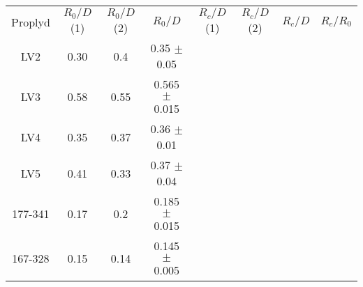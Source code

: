 \begin{table*}
\begin{tabular}{|c|c|c|c|c|c|c|c|}
Proplyd & $R_0/D$ (1) & $R_0/D $ (2) & $R_0/D$ & $R_c/D$ (1) & $R_c/D $ (2)  & $R_c/D$  & $R_c/R_0$ \\
LV2     &   0.30  & 0.4  & 0.35  $\pm$ 0.05    & & & & \\
LV3     &   0.58  & 0.55 & 0.565 $\pm$ 0.015   & & & & \\
LV4     &   0.35  & 0.37 & 0.36  $\pm$ 0.01    & & & & \\
LV5     &   0.41  & 0.33 & 0.37  $\pm$ 0.04    & & & & \\
177-341 &   0.17  & 0.2  & 0.185 $\pm$ 0.015   & & & & \\
167-328 &   0.15  & 0.14 & 0.145 $\pm$ 0.005   & & & & 
\end{tabular}
\end{table*}
